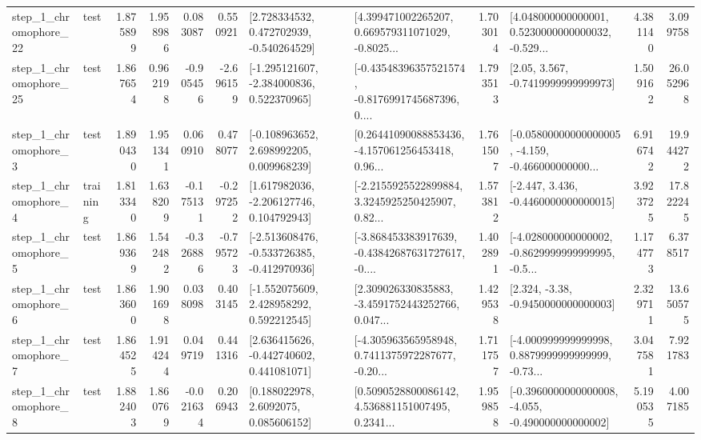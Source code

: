 \begin{tabular}{llrrrrllrlrr}
    step\_1\_chromophore\_22 &      test &      1.875899 &    1.958986 &      0.083087 &  0.550921 &    [2.728334532, 0.472702939, -0.540264529] &  [4.399471002265207, 0.669579311071029, -0.8025... &       1.703014 &  [4.048000000000001, 0.5230000000000032, -0.529... &            4.381140 &          3.099758 \\
    step\_1\_chromophore\_25 &      test &      1.867654 &    0.962198 &     -0.905456 & -2.696159 &   [-1.295121607, -2.384000836, 0.522370965] &  [-0.43548396357521574, -0.8176991745687396, 0.... &       1.793513 &                 [2.05, 3.567, -0.7419999999999973] &            1.509162 &         26.052968 \\
     step\_1\_chromophore\_3 &      test &      1.890430 &    1.951341 &      0.060910 &  0.478077 &    [-0.108963652, 2.698992205, 0.009968239] &  [0.26441090088853436, -4.157061256453418, 0.96... &       1.761507 &  [-0.05800000000000005, -4.159, -0.466000000000... &            6.916742 &         19.944272 \\
     step\_1\_chromophore\_4 &  training &      1.813340 &    1.638209 &     -0.175131 & -0.297252 &    [1.617982036, -2.206127746, 0.104792943] &  [-2.2155925522899884, 3.3245925250425907, 0.82... &       1.573812 &               [-2.447, 3.436, -0.4460000000000015] &            3.923725 &         17.822245 \\
     step\_1\_chromophore\_5 &      test &      1.869369 &    1.542482 &     -0.326886 & -0.795723 &  [-2.513608476, -0.533726385, -0.412970936] &  [-3.868453383917639, -0.43842687631727617, -0.... &       1.402891 &  [-4.028000000000002, -0.8629999999999995, -0.5... &            1.174773 &          6.378517 \\
     step\_1\_chromophore\_6 &      test &      1.863600 &    1.901698 &      0.038098 &  0.403145 &    [-1.552075609, 2.428958292, 0.592212545] &  [2.309026330835883, -3.4591752443252766, 0.047... &       1.429538 &                [2.324, -3.38, -0.9450000000000003] &            2.329711 &         13.650575 \\
     step\_1\_chromophore\_7 &      test &      1.864525 &    1.914244 &      0.049719 &  0.441316 &    [2.636415626, -0.442740602, 0.441081071] &  [-4.305963565958948, 0.7411375972287677, -0.20... &       1.711757 &  [-4.000999999999998, 0.8879999999999999, -0.73... &            3.047581 &          7.921783 \\
     step\_1\_chromophore\_8 &      test &      1.882403 &    1.860769 &     -0.021634 &  0.206943 &       [0.188022978, 2.6092075, 0.085606152] &  [0.5090528800086142, 4.536881151007495, 0.2341... &       1.959858 &  [-0.3960000000000008, -4.055, -0.490000000000002] &            5.190535 &          4.007185 \\

\end{tabular}
